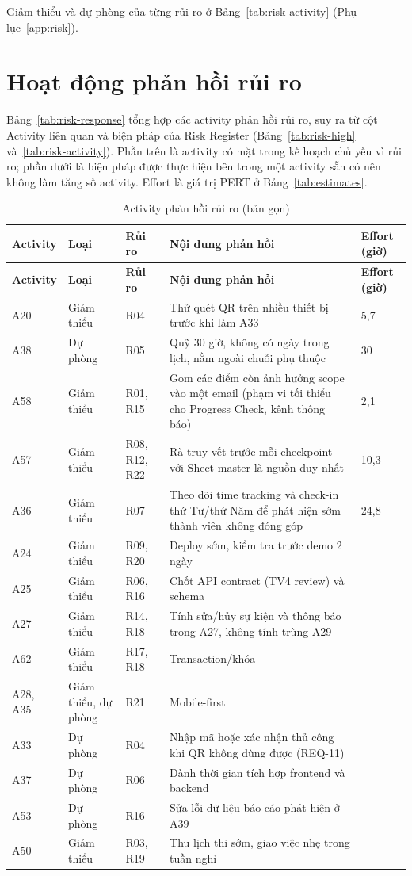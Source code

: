 Giảm thiểu và dự phòng của từng rủi ro ở Bảng~\ref{tab:risk-activity} (Phụ lục~\ref{app:risk}).
\section{Hoạt động phản hồi rủi ro}
\label{sec:2-9}
Bảng~\ref{tab:risk-response} tổng hợp các activity phản hồi rủi ro, suy ra từ cột Activity liên quan và biện pháp của Risk Register (Bảng~\ref{tab:risk-high} và~\ref{tab:risk-activity}). Phần trên là activity có mặt trong kế hoạch chủ yếu vì rủi ro; phần dưới là biện pháp được thực hiện bên trong một activity sẵn có nên không làm tăng số activity. Effort là giá trị PERT ở Bảng~\ref{tab:estimates}.

\begingroup\tblsetup\tblzebra
\begin{longtable}{L{1.5cm}L{1.9cm}L{1.6cm}L{7.4cm}L{1.2cm}}
\caption{Activity phản hồi rủi ro (bản gọn)}\label{tab:risk-response-ct}\\
\toprule
{}\textbf{Activity} & \textbf{Loại} & \textbf{Rủi ro} & \textbf{Nội dung phản hồi} & \textbf{Effort (giờ)} \\
\midrule
\endfirsthead
\toprule
{}\textbf{Activity} & \textbf{Loại} & \textbf{Rủi ro} & \textbf{Nội dung phản hồi} & \textbf{Effort (giờ)} \\
\midrule
\endhead
\bottomrule
\endlastfoot
A20 & Giảm thiểu & R04 & Thử quét QR trên nhiều thiết bị trước khi làm A33 & 5,7 \\
A38 & Dự phòng & R05 & Quỹ 30 giờ, không có ngày trong lịch, nằm ngoài chuỗi phụ thuộc & 30 \\
A58 & Giảm thiểu & R01, R15 & Gom các điểm còn ảnh hưởng scope vào một email (phạm vi tối thiểu cho Progress Check, kênh thông báo) & 2,1 \\
A57 & Giảm thiểu & R08, R12, R22 & Rà truy vết trước mỗi checkpoint với Sheet master là nguồn duy nhất & 10,3 \\
A36 & Giảm thiểu & R07 & Theo dõi time tracking và check-in thứ Tư/thứ Năm để phát hiện sớm thành viên không đóng góp & 24,8 \\
A24 & Giảm thiểu & R09, R20 & Deploy sớm, kiểm tra trước demo 2 ngày &  \\
A25 & Giảm thiểu & R06, R16 & Chốt API contract (TV4 review) và schema &  \\
A27 & Giảm thiểu & R14, R18 & Tính sửa/hủy sự kiện và thông báo trong A27, không tính trùng A29 &  \\
A62 & Giảm thiểu & R17, R18 & Transaction/khóa &  \\
A28, A35 & Giảm thiểu, dự phòng & R21 & Mobile-first &  \\
A33 & Dự phòng & R04 & Nhập mã hoặc xác nhận thủ công khi QR không dùng được (REQ-11) &  \\
A37 & Dự phòng & R06 & Dành thời gian tích hợp frontend và backend &  \\
A53 & Dự phòng & R16 & Sửa lỗi dữ liệu báo cáo phát hiện ở A39 &  \\
A50 & Giảm thiểu & R03, R19 & Thu lịch thi sớm, giao việc nhẹ trong tuần nghỉ &  \\
\end{longtable}
\endgroup

